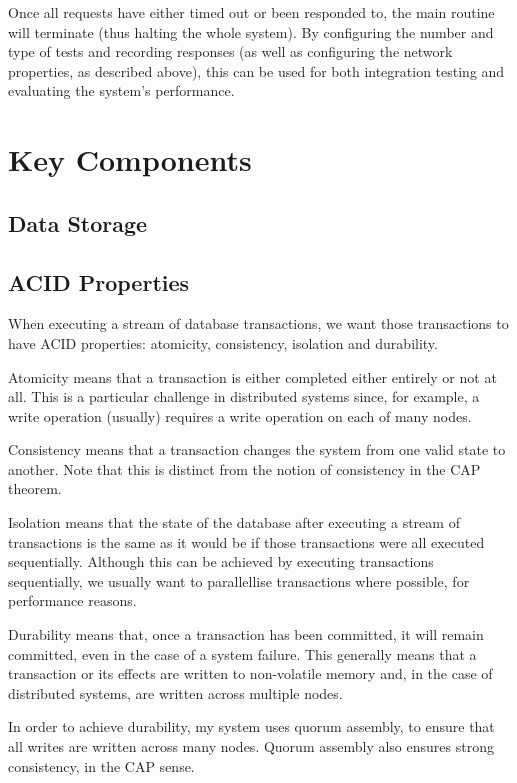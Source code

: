 \documentclass[12pt,a4paper]{article}
\begin{document}
Once all requests have either timed out or been responded to, the main routine will terminate (thus halting the whole system). By configuring the number and type of tests and recording responses (as well as configuring the network properties, as described above), this can be used for both integration testing and evaluating the system's performance.


\section*{Key Components}

\subsection*{Data Storage}

\subsection*{ACID Properties}

When executing a stream of database transactions, we want those transactions to have ACID properties: atomicity, consistency, isolation and durability.

Atomicity means that a transaction is either completed either entirely or not at all. This is a particular challenge in distributed systems since, for example, a write operation (usually) requires a write operation on each of many nodes.

Consistency means that a transaction changes the system from one valid state to another. Note that this is distinct from the notion of consistency in the CAP theorem.

Isolation means that the state of the database after executing a stream of transactions is the same as it would be if those transactions were all executed sequentially. Although this can be achieved by executing transactions sequentially, we usually want to parallellise transactions where possible, for performance reasons.

Durability means that, once a transaction has been committed, it will remain committed, even in the case of a system failure. This generally means that a transaction or its effects are written to non-volatile memory and, in the case of distributed systems, are written across multiple nodes.

In order to achieve durability, my system uses quorum assembly, to ensure that all writes are written across many nodes. Quorum assembly also ensures strong consistency, in the CAP sense.
\end{document}
